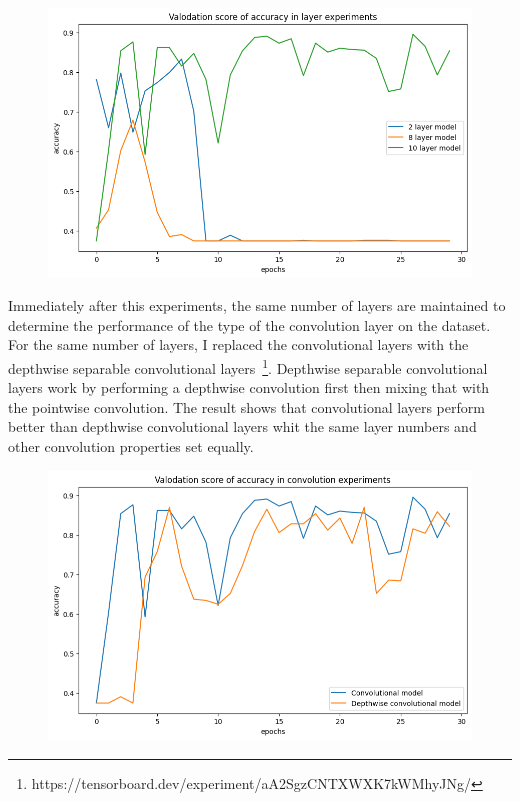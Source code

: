 \begin{figure}[H]
    \centering
    \includegraphics[width=\textwidth]{img/layerexpaccuracy.png}
    \caption{}
    \label{fig:layerexpacc}
\end{figure}

Immediately after this experiments, the same number of layers are maintained to determine the performance of the type of the convolution layer on the dataset.
For the same number of layers, I replaced the convolutional layers with the depthwise separable convolutional layers~\footnote{https://tensorboard.dev/experiment/aA2SgzCNTXWXK7kWMhyJNg/}.
Depthwise separable convolutional layers work by performing a depthwise convolution first then mixing that with the pointwise convolution.
The result shows that convolutional layers perform better than depthwise convolutional layers whit the same layer numbers and other convolution properties set equally.

\begin{figure}[H]
    \centering
    \includegraphics[width=.8\textwidth]{img/deptoconvexpaccuracy.png}
    \caption{}
    \label{fig:depttoconvacc}
\end{figure}

